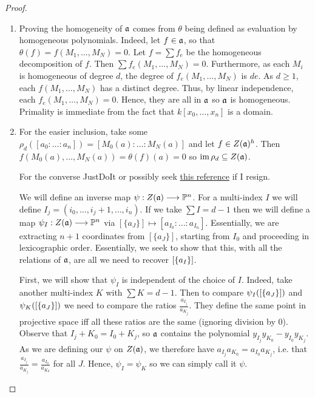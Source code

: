 \begin{proof}
    \begin{enumerate}[label = (\alph*)]
        \item Proving the homogeneity of $\mathfrak a$ comes from $\theta$ being defined as evaluation by homogeneous polynomials. Indeed, let $f \in \mathfrak a$, so that $\theta(f) = f(M_1, \dots, M_N) = 0$. Let $f = \sum f_e$ be the homogeneous decomposition of $f$. Then $\sum f_e(M_1, \dots, M_N) = 0$. Furthermore, as each $M_i$ is homogeneous of degree $d$, the degree of $f_e(M_1, \dots, M_N)$ is $de$. As $d \geq 1$, each $f(M_1, \dots, M_N)$ has a distinct degree. Thus, by linear independence, each $f_e(M_1, \dots, M_N) = 0$. Hence, they are all in $\mathfrak a$ so $\mathfrak a$ is homogeneous. Primality is immediate from the fact that $k[x_0, \dots, x_n]$ is a domain.

        \item For the easier inclusion, take some $\rho_d([a_0 : \dots : a_n]) = [M_0(a) : \dots : M_N(a)]$ and let $f \in Z(\mathfrak a)^h$. Then $f(M_0(a), \dots, M_N(a)) = \theta(f)(a) = 0$ so $\operatorname{im} \rho_d \subseteq Z(\mathfrak a)$. 

        For the converse JustDoIt or possibly seek \href{https://www.mathreference.com/ag-pv,duple.html}{this reference} if I resign.

        We will define an inverse map $\psi: Z(\mathfrak a) \longrightarrow \mathbb P^n$. For a multi-index $I$ we will define $I_j = (i_0, \dots, i_j + 1, \dots, i_n)$. If we take $\sum I = d - 1$ then we will define a map $\psi_I: Z(\mathfrak a) \longrightarrow \mathbb P^n$ via $[\{a_J\}] \mapsto [a_{I_0} : \dots : a_{I_n}]$. Essentially, we are extracting $n + 1$ coordinates from $[\{a_J\}]$, starting from $I_0$ and proceeding in lexicographic order. Essentially, we seek to show that this, with all the relations of $\mathfrak a$, are all we need to recover $[{\left\{a_I\right\}}]$.

        First, we will show that $\psi_I$ is independent of the choice of $I$. Indeed, take another multi-index $K$ with $\sum K = d - 1$. Then to compare $\psi_I([{\left\{a_J\right\}}])$ and $\psi_K([{\left\{a_J\right\}}])$ we need to compare the ratios $\frac{a_{I_j}}{a_{K_j}}$. They define the same point in projective space iff all these ratios are the same (ignoring division by $0$). Observe that $I_j + K_0 = I_0 + K_j$, so $\mathfrak a$ contains the polynomial $y_{I_j} y_{K_0} - y_{I_0} y_{K_j}$. As we are defining our $\psi$ on $Z(\mathfrak a)$, we therefore have $a_{I_j} a_{K_0} = a_{I_0} a_{K_j}$, i.e. that $\frac{a_{I_j}}{a_{K_j}} = \frac{a_{I_0}}{a_{K_0}}$ for all $J$. Hence, $\psi_I = \psi_K$ so we can simply call it $\psi$.


\end{enumerate}
\end{proof}
